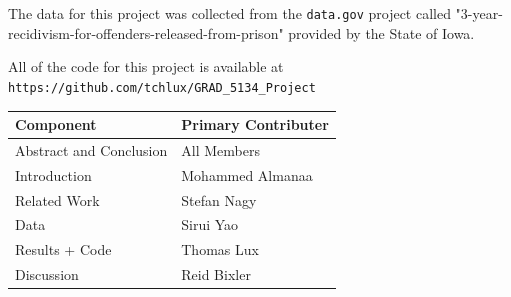 \documentclass[sigconf]{acmart}
\begin{document}
The data for this project was collected from the \texttt{data.gov} project called "3-year-recidivism-for-offenders-released-from-prison" provided by the State of Iowa.

\vspace{5mm}

All of the code for this project is available at \\
\texttt{https://github.com/tchlux/GRAD\_5134\_Project}

\vspace{5mm}

\begin{tabular}{l|l}
  \textbf{Component} & \textbf{Primary Contributer} \\ \hline
  Abstract and Conclusion & All Members \\
  Introduction & Mohammed Almanaa \\
  Related Work & Stefan Nagy \\
  Data & Sirui Yao \\
  Results + Code & Thomas Lux \\
  Discussion & Reid Bixler \\
\end{tabular}

\vspace{5mm}



\end{document}

